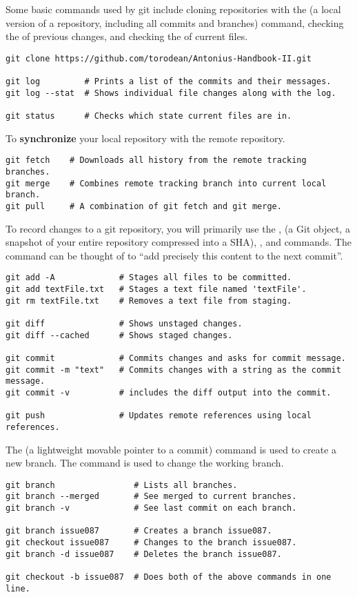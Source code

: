 Some basic commands used by git include cloning repositories with the  (a local version of a repository, including all commits and branches) command, checking the  of previous changes, and checking the  of current files.
\begin{lstlisting}[style=terminalstyle]
git clone https://github.com/torodean/Antonius-Handbook-II.git

git log         # Prints a list of the commits and their messages.
git log --stat  # Shows individual file changes along with the log.

git status      # Checks which state current files are in.
\end{lstlisting}

To \textbf{synchronize} your local repository with the remote repository.
\begin{lstlisting}[style=terminalstyle]
git fetch    # Downloads all history from the remote tracking branches.
git merge    # Combines remote tracking branch into current local branch. 
git pull     # A combination of git fetch and git merge.
\end{lstlisting}

To record changes to a git repository, you will primarily use the ,  (a Git object, a snapshot of your entire repository compressed into a SHA), , and  commands. The  command can be thought of to ``add precisely this content to the next commit''. 
\begin{lstlisting}[style=terminalstyle]
git add -A             # Stages all files to be committed.
git add textFile.txt   # Stages a text file named 'textFile'.
git rm textFile.txt    # Removes a text file from staging.

git diff               # Shows unstaged changes.
git diff --cached      # Shows staged changes.

git commit             # Commits changes and asks for commit message.
git commit -m "text"   # Commits changes with a string as the commit message.
git commit -v          # includes the diff output into the commit.

git push               # Updates remote references using local references.
\end{lstlisting}




The  (a lightweight movable pointer to a commit) command is used to create a new branch. The  command is used to change the working branch.
\begin{lstlisting}[style=terminalstyle]
git branch                # Lists all branches.
git branch --merged       # See merged to current branches.
git branch -v             # See last commit on each branch.

git branch issue087       # Creates a branch issue087.
git checkout issue087     # Changes to the branch issue087.
git branch -d issue087    # Deletes the branch issue087.

git checkout -b issue087  # Does both of the above commands in one line.
\end{lstlisting}

